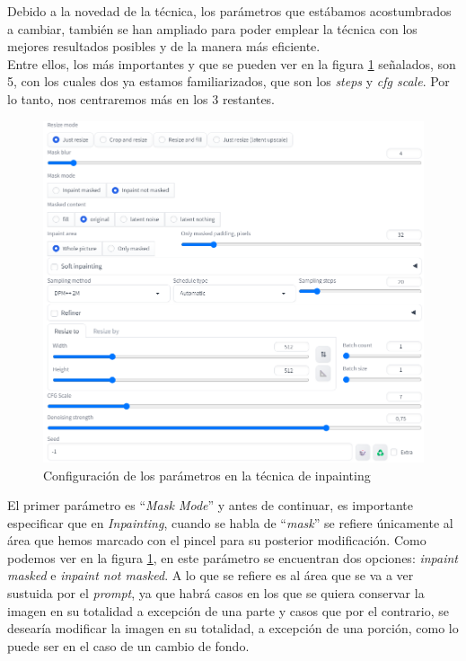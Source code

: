 \begin{itemize}
Debido a la novedad de la técnica, los parámetros que estábamos acostumbrados a cambiar, también se han ampliado para poder emplear la técnica con los mejores resultados posibles y de la manera más eficiente. \\

Entre ellos, los más importantes y que se pueden ver en la figura \ref{fig:paramsinpainting} señalados, son 5, con los cuales dos ya estamos familiarizados, que son los \textit{steps} y \textit{cfg scale}. Por lo tanto, nos centraremos más en los 3 restantes. \\

\begin{figure}[h]
	\centering
	\includegraphics[width = 0.6
	\textwidth]{Imagenes/Vectorial/parametrosinpainting.png}
	\caption{Configuración de los parámetros en la técnica de inpainting}
	\label{fig:paramsinpainting}
\end{figure}

El primer parámetro es ``\textit{Mask Mode}'' y antes de continuar, es importante especificar que en \textit{Inpainting}, cuando se habla de ``\textit{mask}'' se refiere únicamente al área que hemos marcado con el pincel para su posterior modificación. Como podemos ver en la figura \ref{fig:paramsinpainting}, en este parámetro se encuentran dos opciones: \textit{inpaint masked} e \textit{inpaint not masked}. A lo que se refiere es al área que se va a ver sustuida por el \textit{prompt}, ya que habrá casos en los que se quiera conservar la imagen en su totalidad a excepción de una parte y casos que por el contrario, se desearía modificar la imagen en su totalidad, a excepción de una porción, como lo puede ser en el caso de un cambio de fondo. \\


\end{itemize}
